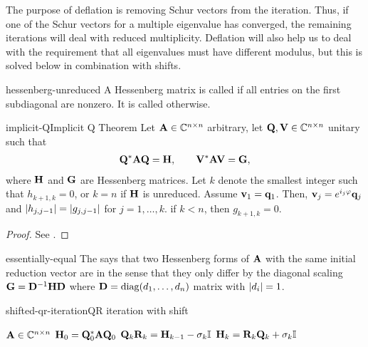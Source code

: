 \begin{remark}
  The purpose of deflation is removing Schur vectors from the
  iteration. Thus, if one of the Schur vectors for a multiple
  eigenvalue has converged, the remaining iterations will deal with
  reduced multiplicity. Deflation will also help us to deal with the
  requirement that all eigenvalues must have different modulus, but
  this is solved below in combination with shifts.
\end{remark}

\begin{Definition}{hessenberg-unreduced}
  A Hessenberg matrix is called  if all entries on
  the first subdiagonal are nonzero. It is called 
  otherwise.
\end{Definition}

\begin{Theorem*}{implicit-Q}{Implicit Q Theorem}
  Let $\mathbf A\in\mathbb C^{n\times n}$ arbitrary, let $\mathbf Q,\mathbf V\in\mathbb C^{n\times n}$ unitary such that
  \begin{gather}
    \mathbf Q^*\mathbf A\mathbf Q = \mathbf H,\qquad \mathbf V^*\mathbf A\mathbf V = \mathbf G,
  \end{gather}
  where $\mathbf H$ and $\mathbf G$ are Hessenberg matrices. Let $k$ denote
  the smallest integer such that $h_{k+1,k} = 0$, or $k=n$ if $\mathbf H$
  is unreduced. Assume $\mathbf v_1 = \mathbf q_1$. Then,
  $\mathbf v_j = e^{i_j\varphi}\mathbf q_j$ and $\lvert h_{j,j-1}\rvert = \lvert g_{j,j-1}\rvert$
  for $j=1,\dots,k$. if $k<n$, then $g_{k+1,k} = 0$.
\end{Theorem*}

\begin{proof}
  See \cite[Theorem 7.4-2]{GolubVanLoan83}.
\end{proof}

\begin{Definition}{essentially-equal}
  The  says that two Hessenberg forms of $\mathbf A$ with the same initial reduction vector are  in the sense that they only differ by the diagonal scaling $\mathbf G = \mathbf D^{-1}\mathbf H\mathbf D$ where $\mathbf D=\operatorname{diag}(d_1,\dots,d_n)$ matrix with $\lvert d_{i}\rvert = 1$.
\end{Definition}

\begin{Algorithm*}{shifted-qr-iteration}{QR iteration with shift}
  \begin{algorithmic}[1]
    \Require $\mathbf A\in\mathbb C^{n\times n}$
    \State $\mathbf H_0 = \mathbf Q_0^*\mathbf A\mathbf Q_0$
    \State $\mathbf Q_k\mathbf R_k = \mathbf H_{k-1} - \sigma_k\mathbb I$
    \State $\mathbf H_{k} = \mathbf R_k\mathbf Q_k + \sigma_k\mathbb I$
    \EndFor
  \end{algorithmic}
\end{Algorithm*}

